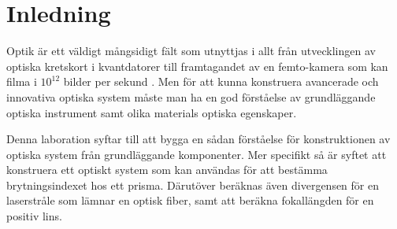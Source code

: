 \documentclass[a4paper]{article}
\begin{document}
\vspace{3mm}

\section{Inledning}

%



Optik är ett väldigt mångsidigt fält som utnyttjas i allt från utvecklingen av optiska kretskort i kvantdatorer \cite{quantumOptics} till framtagandet av en femto-kamera som kan filma i $10^{12}$ bilder per sekund \cite{femtoKamera}. Men för att kunna konstruera avancerade och innovativa optiska system måste man ha en god förståelse av grundläggande optiska instrument samt olika materials optiska egenskaper.

Denna laboration syftar till att bygga en sådan förståelse för konstruktionen av optiska system från grundläggande komponenter. Mer specifikt så är syftet att konstruera ett optiskt system som kan användas för att bestämma brytningsindexet hos ett prisma. Därutöver beräknas även divergensen för en laserstråle som lämnar en optisk fiber, samt att beräkna fokallängden för en positiv lins.
\end{document}

